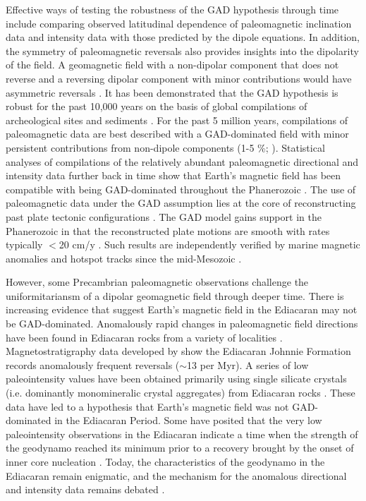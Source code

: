 Effective ways of testing the robustness of the GAD hypothesis through time include comparing observed latitudinal dependence of paleomagnetic inclination data and intensity data with those predicted by the dipole equations. In addition, the symmetry of paleomagnetic reversals also provides insights into the dipolarity of the field. A geomagnetic field with a non-dipolar component that does not reverse and a reversing dipolar component with minor contributions would have asymmetric reversals \citep[e.g.][]{Pesonen1981a, Pesonen1983a}. It has been demonstrated that the GAD hypothesis is robust for the past 10,000 years on the basis of global compilations of archeological sites and sediments \cite[e.g.][]{McElhinny1996a}. For the past 5 million years, compilations of paleomagnetic data are best described with a GAD-dominated field with minor persistent contributions from non-dipole components (1-5 \%; \citealp{Tauxe2005a, Valet2011b}). Statistical analyses of compilations of the relatively abundant paleomagnetic directional and intensity data further back in time show that Earth's magnetic field has been compatible with being GAD-dominated throughout the Phanerozoic \citep{Evans1976a, Lhuillier2023a}. The use of paleomagnetic data under the GAD assumption lies at the core of reconstructing past plate tectonic configurations \citep{Creer1954a, Irving1977a, Besse2002a, Torsvik2012a}. The GAD model gains support in the Phanerozoic in that the reconstructed plate motions are smooth with rates typically $<$20 cm/y \citep{Torsvik2012a}. Such results are independently verified by marine magnetic anomalies and hotspot tracks since the mid-Mesozoic \citep{Doubrovine2012a, Muller1993a}.

However, some Precambrian paleomagnetic observations challenge the uniformitariansm of a dipolar geomagnetic field through deeper time. There is increasing evidence that suggest Earth's magnetic field in the Ediacaran may not be GAD-dominated. Anomalously rapid changes in paleomagnetic field directions have been found in Ediacaran rocks from a variety of localities \cite[e.g.][]{Abrajevitch2010a, Meert2014a, Halls2015a}. Magnetostratigraphy data developed by \cite{Kodama2021a} show the Ediacaran Johnnie Formation records anomalously frequent reversals ($\sim$13 per Myr). A series of low paleointensity values have been obtained primarily using single silicate crystals (i.e. dominantly monomineralic crystal aggregates) from Ediacaran rocks \citep{Bono2019a, Thallner2021b, Thallner2021a}. These data have led to a hypothesis that Earth's magnetic field was not GAD-dominated in the Ediacaran Period. Some have posited that the very low paleointensity observations in the Ediacaran indicate a time when the strength of the geodynamo reached its minimum prior to a recovery brought by the onset of inner core nucleation \cite[e.g.][]{Bono2019a}. Today, the characteristics of the geodynamo in the Ediacaran remain enigmatic, and the mechanism for the anomalous directional and intensity data remains debated \citep{Domeier2023a}.

